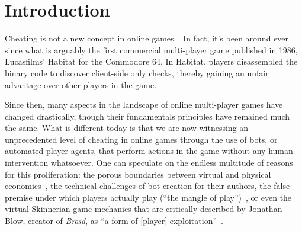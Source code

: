 \documentclass{acm_proc_article-sp}
\begin{document}
\begin{comment}

\begin{abstract}
Bots are a huge problem in online games. Current bot detection approaches they assume that people play differently form humans and that bots have deterministic behavior while actual people do not. Consequently, common approaches include low-level protocol inspection.
\end{abstract}

\category{H.4}{Information Systems Applications}{Miscellaneous}
\category{D.2.8}{Software Engineering}{Metrics}[complexity measures, performance measures]

\terms{Theory}

\keywords{bot detection, social games, mimic attacks, human observational proofs} %

\end{comment}

\section{Introduction}

Cheating is not a new concept in online games.~\cite{classification} In fact, it's been around ever since what is arguably the first commercial multi-player game published in 1986, Lucasfilms' Habitat for the Commodore 64. In Habitat, players disassembled the binary code to discover client-side only checks, thereby gaining an unfair advantage over other players in the game.~\cite{habitat}

Since then, many aspects in the landscape of online multi-player games have changed drastically, though their fundamentals principles have remained much the same. What is different today is that we are now witnessing an unprecedented level of cheating in online games through the use of bots, or automated player agents, that perform actions in the game without any human intervention whatsoever. One can speculate on the endless multitude of reasons for this proliferation: the porous boundaries between virtual and physical economics~\cite{preventbotitem}, the technical challenges of bot creation for their authors, the false premise under which players actually play (``the mangle of play'')~\cite{mangle}, or even the virtual Skinnerian game mechanics that are critically described by Jonathan Blow, creator of \textit{Braid}, as ``a form of [player] exploitation''~\cite{skinner}.
\end{document}
